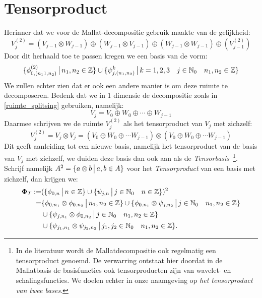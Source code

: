 \section{Tensorproduct}
\label{tensorS}

Herinner dat we voor de Mallat-decompositie gebruik maakte van de gelijkheid:
\[
V_{j}^{(2)} = (V_{j-1}\otimes W_{j-1}) \oplus (W_{j-1}\otimes V_{j-1}) \oplus
(W_{j-1}\otimes W_{j-1}) \oplus (V^{(2)}_{j-1})
\]
Door dit herhaald toe te passen kregen we een basis van de vorm:
\[
\{\phi^{(2)}_{0,(n_11,n_2)}\,\big|\, n_1,n_2\in\mathbb{Z}\}\cup
\{\psi^k_{j,(n_1,n_2)} \,\big|\, k=1,2,3\quad j\in \mathbb{N}_0 \quad n_1,n_2\in\mathbb{Z}\}
\]
We zullen echter zien dat er ook een andere manier is om deze ruimte te decomposeren.
Bedenk dat we in 1 dimensie de decompositie zoals in \eqref{ruimte_splitsing} gebruiken, namelijk:
\[
V_j = V_0 \oplus W_0 \oplus \cdots \oplus W_{j-1}
\]
Daarmee schrijven we de ruimte $V^{(2)}_j$ als het tensorproduct van $V_j$ met zichzelf:
\[
V^{(2)}_j = V_j\otimes V_j = (V_0\oplus W_0\oplus\cdots W_{j-1})\otimes(V_0\oplus W_0\oplus\cdots W_{j-1})
\]
Dit geeft aanleiding tot een nieuwe basis, namelijk het tensorproduct van de basis van $V_j$ met zichzelf,
we duiden deze basis dan ook aan als de \emph{Tensorbasis}~\footnote{In de literatuur wordt de Mallatdecompositie ook regelmatig een tensorproduct genoemd. 
De verwarring ontstaat hier doordat in de Mallatbasis de basisfuncties ook tensorproducten zijn van wavelet- 
en schalingsfuncties. We doelen echter in onze naamgeving op \emph{het tensorproduct van twee bases}.}.
Schrijf namelijk \mbox{$A^2 = \{a\otimes b \,\big|\, a,b\in A\}$} voor het \emph{Tensorproduct} van een basis met zichzelf,
dan krijgen we:
\begin{equation}
  \label{tensor_basis_def}
  \begin{split}
    \boldsymbol\Phi_T :=& (\{\phi_{0,n}\,\big|\, n\in\mathbb{Z}\}\cup \{\psi_{j,n}\,\big|\, j\in\mathbb{N}_0\quad n\in\mathbb{Z}\})^2\\
                        =& \{\phi_{0,n_1}\otimes\phi_{0,n_2}\,\big|\, n_1,n_2\in\mathbb{Z}\} 
                        \cup \{\phi_{0,n_1}\otimes\psi_{j,n_2}\,\big|\, j\in\mathbb{N}_0\quad n_1,n_2\in\mathbb{Z}\} \\    
                         & \cup \{\psi_{j,n_1}\otimes\phi_{0,n_2}\,\big|\, j\in\mathbb{N}_0\quad n_1,n_2\in\mathbb{Z}\} \\
                         & \cup \{\psi_{j_1,n_1}\otimes\psi_{j_2,n_2}\,\big|\, j_1,j_2\in\mathbb{N}_0\quad n_1,n_2\in\mathbb{Z}\}.
  \end{split}
\end{equation}

